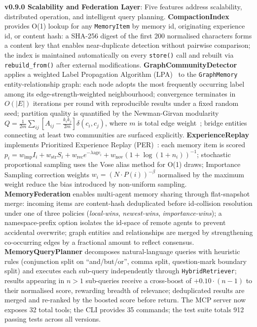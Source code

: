 \documentclass[conference]{IEEEtran}
\begin{document}
\textbf{v0.9.0 Scalability and Federation Layer}: Five features address scalability, distributed operation, and intelligent query planning. \textbf{CompactionIndex} provides O(1) lookup for any \texttt{MemoryItem} by memory id, originating experience id, or content hash: a SHA-256 digest of the first 200 normalised characters forms a content key that enables near-duplicate detection without pairwise comparison; the index is maintained automatically on every \texttt{store()} call and rebuilt via \texttt{rebuild\_from()} after external modifications. \textbf{GraphCommunityDetector} applies a weighted Label Propagation Algorithm (LPA)~\cite{raghavan2007near} to the \texttt{GraphMemory} entity-relationship graph: each node adopts the most frequently occurring label among its edge-strength-weighted neighbourhood; convergence terminates in $O(|E|)$ iterations per round with reproducible results under a fixed random seed; partition quality is quantified by the Newman-Girvan modularity $Q = \frac{1}{2m}\sum_{ij}[A_{ij} - \frac{k_i k_j}{2m}]\delta(c_i,c_j)$, where $m$ is total edge weight~\cite{newman2004finding}; bridge entities connecting at least two communities are surfaced explicitly. \textbf{ExperienceReplay} implements Prioritized Experience Replay (PER)~\cite{schaul2016prioritized}: each memory item is scored $p_i = w_{\text{imp}} I_i + w_{\text{str}} S_i + w_{\text{rec}} e^{-\lambda \text{age}_i} + w_{\text{nov}} (1+\log(1+n_i))^{-1}$; stochastic proportional sampling uses the Vose alias method for O(1) draws; Importance Sampling correction weights $w_i = (N \cdot P(i))^{-\beta}$ normalised by the maximum weight reduce the bias introduced by non-uniform sampling. \textbf{MemoryFederation} enables multi-agent memory sharing through flat-snapshot merge: incoming items are content-hash deduplicated before id-collision resolution under one of three policies (\textit{local-wins}, \textit{newest-wins}, \textit{importance-wins}); a namespace-prefix option isolates the id-space of remote agents to prevent accidental overwrite; graph entities and relationships are merged by strengthening co-occurring edges by a fractional amount to reflect consensus. \textbf{MemoryQueryPlanner} decomposes natural-language queries with heuristic rules (conjunction split on ``and/but/or'', comma split, question-mark boundary split) and executes each sub-query independently through \texttt{HybridRetriever}; results appearing in $n>1$ sub-queries receive a cross-boost of $+0.10\cdot(n-1)$ to their normalised score, rewarding breadth of relevance; deduplicated results are merged and re-ranked by the boosted score before return. The MCP server now exposes 32 total tools; the CLI provides 35 commands; the test suite totals 912 passing tests across all versions.
\end{document}
